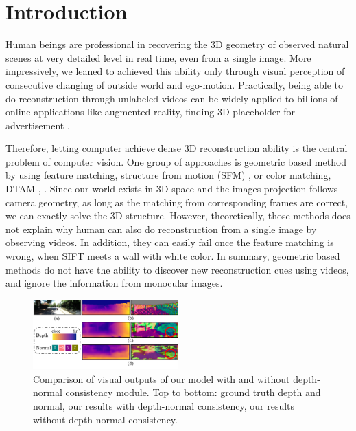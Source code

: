 \section{Introduction}
Human beings are professional in recovering the 3D geometry of observed natural scenes at very detailed level in real time, even from a single image. 
More impressively, we leaned to achieved this ability only through visual perception of consecutive changing of outside world and ego-motion. 
Practically, being able to do reconstruction through unlabeled videos can be widely applied to billions of online  applications like augmented reality, finding 3D placeholder for advertisement \etc.

Therefore, letting computer achieve dense 3D reconstruction ability is the central problem of computer vision. One group of approaches is geometric based method by using feature matching, \eg structure from motion (SFM) \cite{} \etc, or color matching, \eg DTAM \cite{}, \etc. 
Since our world exists in 3D space and the images projection follows camera geometry, as long as the matching from corresponding frames are correct, we can exactly solve the 3D structure. 
However, theoretically, those methods does not explain why human can also do reconstruction from a single image by observing videos. In addition, they can easily fail once the feature matching is wrong, \eg when SIFT\cite{} meets a wall with white color. 
In summary, geometric based methods do not have the ability to discover new reconstruction cues using videos, and ignore the information from monocular images.

\begin{figure}
\centering
\includegraphics[width=0.5\textwidth]{figures/visual_comparison.pdf}
\caption{Comparison of visual outputs of our model with and without depth-normal consistency module. Top to bottom: ground truth depth and normal, our results with depth-normal consistency, our results without depth-normal consistency.}
\label{fig:visual_comparison}
\end{figure}

